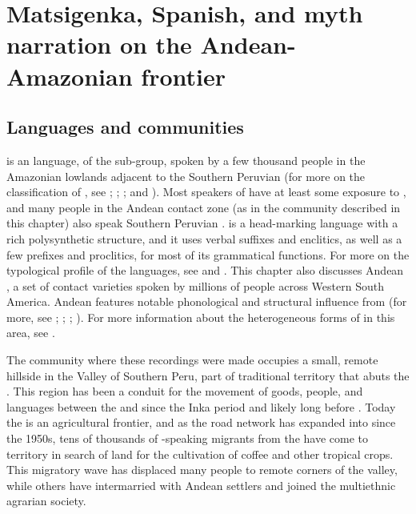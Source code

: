 \documentclass[output=paper]{LSP/langsci}
\begin{document}
\section{ Matsigenka, Spanish, and myth narration on the Andean-Amazonian frontier}
\label{Emmayth.narration}
\subsection{Languages and communities}
\label{Emland.comm}
 is an  language, of the  sub-group, spoken by a few thousand people in the Amazonian lowlands adjacent to the Southern Peruvian  (for more on the classification of , see \citealt{aikhenvald1999}; \citealt[][212--219]{michael08}; \citealt{michael10}; and \citealt{payne81}). Most speakers of  have at least some exposure to , and many people in the Andean contact zone (as in the community described in this chapter) also speak Southern Peruvian  \citep{emlen.2017}.  is a head-marking language with a rich polysynthetic structure, and it uses verbal suffixes and enclitics, as well as a few prefixes and proclitics, for most of its grammatical functions. For more on the typological profile of the  languages, see \citet{michael08} and \citet{mihas15}. This chapter also discusses Andean , a set of contact varieties spoken by millions of people across Western South America. Andean  features notable phonological and structural influence from  (for more, see \citealt[][593--595]{adelaar2004}; \citealt{babel18}; \citealt{cerron03}; \citealt{escobar03}). For more information about the heterogeneous forms of  in this area, see \citet{emlenforth}.
 
The community where these recordings were made occupies a small, remote hillside in the  Valley of Southern Peru, part of traditional  territory that abuts the . This region has been a conduit for the movement of goods, people, and languages between the  and  since the Inka period and likely long before \citep{Gade1972,camino.1977}. Today the  is an agricultural frontier, and as the road network has expanded into  since the 1950s, tens of thousands of -speaking migrants from the  have come to  territory in search of land for the cultivation of coffee and other tropical crops. This migratory wave has displaced many  people to remote corners of the valley, while others have intermarried with Andean settlers and joined the multiethnic agrarian society.
\end{document}

